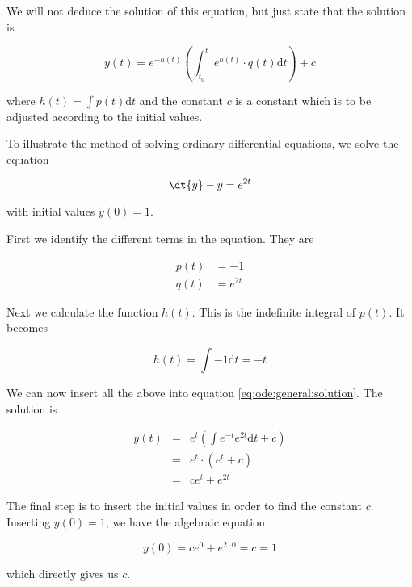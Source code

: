 We will not deduce the solution of this equation, but just state that the solution is

\begin{equation}
  \label{eq:ode:general:solution}
  y(t) = e^{-h(t)} \left( \int_{t_0}^t e^{h(t)} \cdot q(t) \mathrm{d}t \right) + c
\end{equation}

where $h(t) = \int p(t) \mathrm{d}t$ and the constant $c$ is a constant which is to be adjusted
according to the initial values.

\begin{example}
  To illustrate the method of solving ordinary differential equations, we solve the equation

  \begin{equation}
    \dt{y} - y = e^{2t}
  \end{equation}

  with initial values $y(0) = 1$.

  First we identify the different terms in the equation. They are

  \begin{align*}
    p(t) &= -1 \\
    q(t) &= e^{2t}
  \end{align*}

  Next we calculate the function $h(t)$. This is the indefinite integral of $p(t)$. It becomes

  \begin{equation*}
    h(t) = \int -1 \mathrm{d}t = -t
  \end{equation*}

  We can now insert all the above into equation \ref{eq:ode:general:solution}. The solution is

  \begin{eqnarray}
    y(t) &=& e^t \left( \int e^{-t}e^{2t}\mathrm{d}t + c \right) \\ \nonumber
         &=& e^t \cdot \left( e^t + c \right) \\ \nonumber
         &=& ce^t + e^{2t}
  \end{eqnarray}

  The final step is to insert the initial values in order to find the constant $c$. Inserting $y(0) = 1$, we have the algebraic equation

  \begin{equation}
    y(0) = ce^0 + e^{2\cdot0} = c = 1
  \end{equation}

  which directly gives us $c$.
\end{example}


